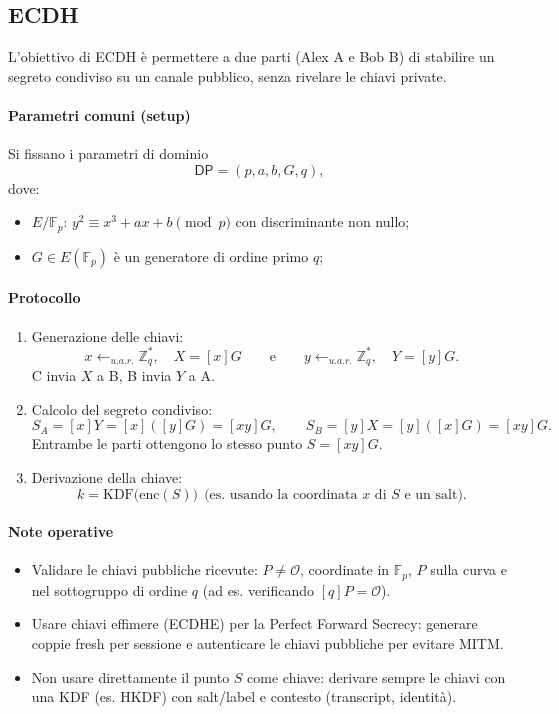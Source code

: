 \documentclass[a4paper, 11pt]{article}
\begin{document}
\subsection{ECDH}

L'obiettivo di ECDH è permettere a due parti (Alex A e Bob B) di stabilire un segreto condiviso su un canale pubblico, senza rivelare le chiavi private.

\paragraph{Parametri comuni (setup)}
Si fissano i parametri di dominio
\[
\mathsf{DP}=(p,a,b,G,q),
\]
dove:
\begin{itemize}[leftmargin=*]
    \item $E/\mathbb{F}_p$: $y^2 \equiv x^3 + ax + b \pmod p$ con discriminante non nullo;
    \item $G\in E(\mathbb{F}_p)$ è un generatore di ordine primo $q$;
\end{itemize}

\paragraph{Protocollo}
\begin{enumerate}[itemsep=2pt, topsep=2pt]
    \item Generazione delle chiavi:
    \[
        x\gets_{u.a.r.}\mathbb{Z}_q^*,\quad X=[x]G
        \qquad\text{e}\qquad
        y\gets_{u.a.r.}\mathbb{Z}_q^*,\quad Y=[y]G.
    \]
    C invia $X$ a B, B invia $Y$ a A.
    \item Calcolo del segreto condiviso:
    \[
        S_A=[x]Y=[x]([y]G)=[xy]G,\qquad
        S_B=[y]X=[y]([x]G)=[xy]G.
    \]
    Entrambe le parti ottengono lo stesso punto $S=[xy]G$.
    \item Derivazione della chiave:
    \[
        k=\mathrm{KDF}\big(\mathrm{enc}(S)\big)\ \ \text{(es. usando la coordinata }x\text{ di }S\text{ e un salt)}.
    \]
\end{enumerate}
\paragraph{Note operative}
\begin{itemize}
    \item Validare le chiavi pubbliche ricevute: $P\neq\mathcal{O}$, coordinate in $\mathbb{F}_p$, $P$ sulla curva e nel sottogruppo di ordine $q$ (ad es. verificando $[q]P=\mathcal{O}$).
    \item Usare chiavi effimere (ECDHE) per la Perfect Forward Secrecy: generare coppie fresh per sessione e autenticare le chiavi pubbliche per evitare MITM.
    \item Non usare direttamente il punto $S$ come chiave: derivare sempre le chiavi con una KDF (es. HKDF) con salt/label e contesto (transcript, identità).
\end{itemize}
\end{document}
